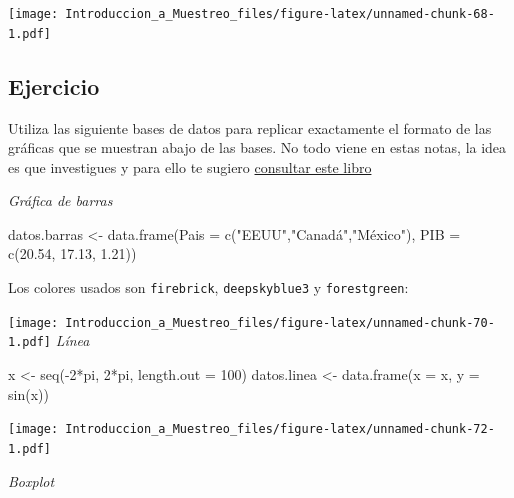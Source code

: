 \documentclass[
]{book}
\newenvironment{Shaded}{\begin{snugshade}}{\end{snugshade}}
\newcommand{\AttributeTok}[1]{\textcolor[rgb]{0.77,0.63,0.00}{#1}}
\newcommand{\DecValTok}[1]{\textcolor[rgb]{0.00,0.00,0.81}{#1}}
\newcommand{\FloatTok}[1]{\textcolor[rgb]{0.00,0.00,0.81}{#1}}
\newcommand{\FunctionTok}[1]{\textcolor[rgb]{0.00,0.00,0.00}{#1}}
\newcommand{\NormalTok}[1]{#1}
\newcommand{\OtherTok}[1]{\textcolor[rgb]{0.56,0.35,0.01}{#1}}
\newcommand{\SpecialCharTok}[1]{\textcolor[rgb]{0.00,0.00,0.00}{#1}}
\newcommand{\StringTok}[1]{\textcolor[rgb]{0.31,0.60,0.02}{#1}}
\begin{document}
\texttt{[image: Introduccion\_a\_Muestreo\_files/figure-latex/unnamed-chunk-68-1.pdf]}

\hypertarget{ejercicio-1}{%
\subsection{Ejercicio}\label{ejercicio-1}}

Utiliza las siguiente bases de datos para replicar exactamente el formato de las gráficas que se muestran abajo de las bases. No todo viene en estas notas, la idea es que investigues y para ello te sugiero \href{https://ggplot2-book.org}{consultar este libro}

\emph{Gráfica de barras}

\begin{Shaded}
\begin{Highlighting}[]
\NormalTok{datos.barras }\OtherTok{\textless{}{-}} \FunctionTok{data.frame}\NormalTok{(}\AttributeTok{Pais =} \FunctionTok{c}\NormalTok{(}\StringTok{"EEUU"}\NormalTok{,}\StringTok{"Canadá"}\NormalTok{,}\StringTok{"México"}\NormalTok{), }
                           \AttributeTok{PIB =} \FunctionTok{c}\NormalTok{(}\FloatTok{20.54}\NormalTok{, }\FloatTok{17.13}\NormalTok{, }\FloatTok{1.21}\NormalTok{))}
\end{Highlighting}
\end{Shaded}

Los colores usados son \texttt{firebrick}, \texttt{deepskyblue3} y \texttt{forestgreen}:

\texttt{[image: Introduccion\_a\_Muestreo\_files/figure-latex/unnamed-chunk-70-1.pdf]}
\emph{Línea}

\begin{Shaded}
\begin{Highlighting}[]
\NormalTok{x }\OtherTok{\textless{}{-}} \FunctionTok{seq}\NormalTok{(}\SpecialCharTok{{-}}\DecValTok{2}\SpecialCharTok{*}\NormalTok{pi, }\DecValTok{2}\SpecialCharTok{*}\NormalTok{pi, }\AttributeTok{length.out =} \DecValTok{100}\NormalTok{)}
\NormalTok{datos.linea }\OtherTok{\textless{}{-}} \FunctionTok{data.frame}\NormalTok{(}\AttributeTok{x =}\NormalTok{ x, }\AttributeTok{y =} \FunctionTok{sin}\NormalTok{(x))}
\end{Highlighting}
\end{Shaded}

\texttt{[image: Introduccion\_a\_Muestreo\_files/figure-latex/unnamed-chunk-72-1.pdf]}

\emph{Boxplot}
\end{document}
